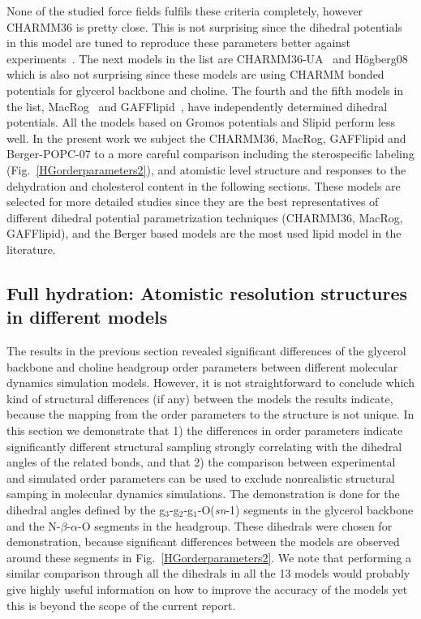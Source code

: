 \documentclass[journal=jacsat,manuscript=article]{achemso}
\begin{document}
None of the studied force fields fulfils these criteria completely, however CHARMM36 is pretty close. 
This is not surprising since the dihedral potentials in this model are tuned to reproduce these parameters better against experiments~\cite{klauda10}.
The next models in the list are CHARMM36-UA~\cite{henin08,lee14} and H\"ogberg08~\cite{hogberg08} which is also not surprising since
these models are using CHARMM bonded potentials for glycerol backbone and choline. The fourth and the fifth models in the list, MacRog~\cite{maciejewski14} and
GAFFlipid~\cite{dickson12}, have independently determined dihedral potentials. All the models based on Gromos potentials and Slipid perform less well.
In the present work we subject the CHARMM36, MacRog, GAFFlipid and Berger-POPC-07 to a more careful comparison including the sterospecific labeling  
(Fig.~\ref{HGorderparameters2}), and atomistic level structure and responses to the dehydration and cholesterol content in the following sections.
These models are selected for more detailed studies since they are the best representatives of different dihedral potential parametrization techniques 
(CHARMM36, MacRog, GAFFlipid), and the Berger based models are the most used lipid model in the literature.


\subsection{Full hydration: Atomistic resolution structures in different models}

The results in the previous section revealed significant differences of the glycerol backbone and choline headgroup
order parameters between different molecular dynamics simulation models.
However, it is not straightforward to conclude which kind of structural differences (if any)
between the models the results indicate, because the mapping from the order parameters to the 
structure is not unique. In this section we demonstrate that 1) the differences in order parameters
indicate significantly different structural sampling strongly correlating with the dihedral angles of the related bonds,
and that 2) the comparison between experimental and simulated order parameters can be used to exclude
nonrealistic structural samping in molecular dynamics simulations. The demonstration is done for 
the dihedral angles defined by the g$_3$-g$_2$-g$_1$-O(\textit{sn}-1) segments in the glycerol backbone and 
the N-$\beta$-$\alpha$-O segments in the headgroup. These dihedrals were chosen for demonstration, because 
significant differences between the models are observed around these segments in Fig.~\ref{HGorderparameters2}.
We note that performing a similar comparison through all the dihedrals in all the 13 models would probably give highly useful
information on how to improve the accuracy of the models yet this is beyond the scope of the current report. 
\end{document}
